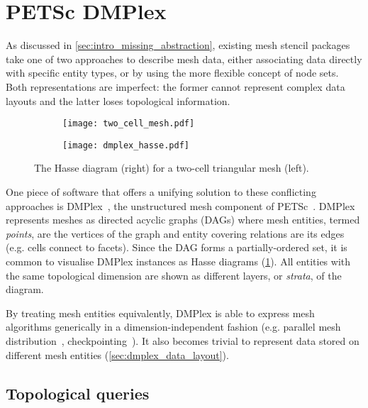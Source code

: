 \documentclass[thesis]{subfiles}
\begin{document}
\section{PETSc DMPlex}
\label{sec:foundations_dmplex}

As discussed in \cref{sec:intro_missing_abstraction}, existing mesh stencil packages take one of two approaches to describe mesh data, either associating data directly with specific entity types, or by using the more flexible concept of node sets.
Both representations are imperfect: the former cannot represent complex data layouts and the latter loses topological information.

\begin{figure}
  \centering
  \begin{subfigure}{.49\textwidth}
    \centering
    \texttt{[image: two\_cell\_mesh.pdf]}
  \end{subfigure}
  \begin{subfigure}{.49\textwidth}
    \centering
    \texttt{[image: dmplex\_hasse.pdf]}
  \end{subfigure}
  \caption{
    The Hasse diagram (right) for a two-cell triangular mesh (left).
  }
  \label{fig:dmplex_hasse}
\end{figure}

One piece of software that offers a unifying solution to these conflicting approaches is DMPlex~\cite{knepleysieve2009,knepleyUnstructuredOverlappingMesh2015,langeEfficientMeshManagement2016}, the unstructured mesh component of PETSc~\cite{petsc-efficient,petsc-user-ref,petsc-web-page}.
DMPlex represents meshes as directed acyclic graphs (DAGs) where mesh entities, termed \emph{points}, are the vertices of the graph and entity covering relations are its edges (e.g. cells connect to facets).
Since the DAG forms a partially-ordered set, it is common to visualise DMPlex instances as Hasse diagrams (\cref{fig:dmplex_hasse}).
All entities with the same topological dimension are shown as different layers, or \emph{strata}, of the diagram.

By treating mesh entities equivalently, DMPlex is able to express mesh algorithms generically in a dimension-independent fashion (e.g. parallel mesh distribution~\cite{knepleyUnstructuredOverlappingMesh2015}, checkpointing~\cite{hamEfficientNtoMCheckpointing2024}).
It also becomes trivial to represent data stored on different mesh entities (\cref{sec:dmplex_data_layout}).

\subsection{Topological queries}
\label{sec:dmplex_queries}
\end{document}
